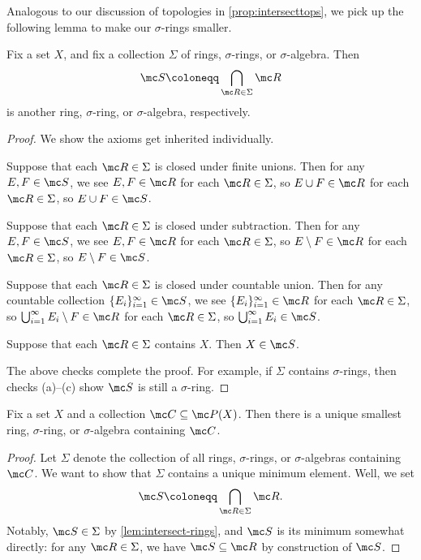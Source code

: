 \documentclass[../notes.tex]{subfiles}
\begin{document}
Analogous to our discussion of topologies in \autoref{prop:intersecttops}, we pick up the following lemma to make our $\sigma$-rings smaller.
\begin{lemma} \label{lem:intersect-rings}
	Fix a set $X$, and fix a collection $\Sigma$ of rings, $\sigma$-rings, or $\sigma$-algebra. Then
	\[\mc S\coloneqq\bigcap_{\mc R\in\Sigma}\mc R\]
	is another ring, $\sigma$-ring, or $\sigma$-algebra, respectively.
\end{lemma}
\begin{proof}
	We show the axioms get inherited individually.
	\begin{listalph}
		\item Suppose that each $\mc R\in\Sigma$ is closed under finite unions. Then for any $E,F\in\mc S$, we see $E,F\in\mc R$ for each $\mc R\in\Sigma$, so $E\cup F\in\mc R$ for each $\mc R\in\Sigma$, so $E\cup F\in\mc S$.
		\item Suppose that each $\mc R\in\Sigma$ is closed under subtraction. Then for any $E,F\in\mc S$, we see $E,F\in\mc R$ for each $\mc R\in\Sigma$, so $E\setminus F\in\mc R$ for each $\mc R\in\Sigma$, so $E\setminus F\in\mc S$.
		\item Suppose that each $\mc R\in\Sigma$ is closed under countable union. Then for any countable collection $\{E_i\}_{i=1}^\infty\in\mc S$, we see $\{E_i\}_{i=1}^\infty\in\mc R$ for each $\mc R\in\Sigma$, so $\bigcup_{i=1}^\infty E_i\setminus F\in\mc R$ for each $\mc R\in\Sigma$, so $\bigcup_{i=1}^\infty E_i\in\mc S$.
		\item Suppose that each $\mc R\in\Sigma$ contains $X$. Then $X\in\mc S$.
	\end{listalph}
	The above checks complete the proof. For example, if $\Sigma$ contains $\sigma$-rings, then checks (a)--(c) show $\mc S$ is still a $\sigma$-ring.
\end{proof}
\begin{corollary} \label{cor:get-small-sigma-ring}
	Fix a set $X$ and a collection $\mc C\subseteq\mc P(X)$. Then there is a unique smallest ring, $\sigma$-ring, or $\sigma$-algebra containing $\mc C$.
\end{corollary}
\begin{proof}
	Let $\Sigma$ denote the collection of all rings, $\sigma$-rings, or $\sigma$-algebras containing $\mc C$. We want to show that $\Sigma$ contains a unique minimum element. Well, we set
	\[\mc S\coloneqq\bigcap_{\mc R\in\Sigma}\mc R.\]
	Notably, $\mc S\in\Sigma$ by \autoref{lem:intersect-rings}, and $\mc S$ is its minimum somewhat directly: for any $\mc R\in\Sigma$, we have $\mc S\subseteq\mc R$ by construction of $\mc S$.
\end{proof}
\end{document}
